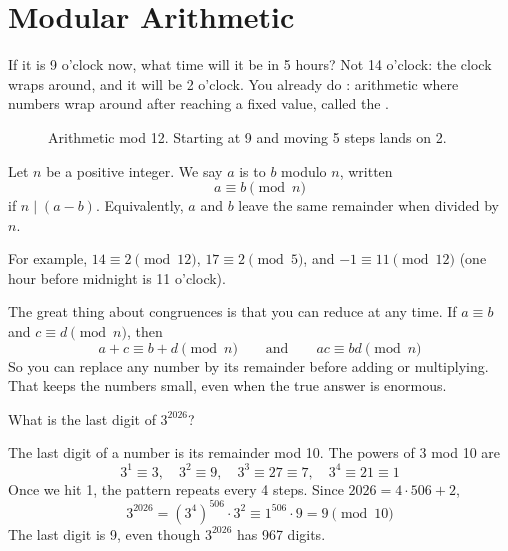 \section{Modular Arithmetic}

If it is 9 o'clock now, what time will it be in 5 hours? Not 14 o'clock: the
clock wraps around, and it will be 2 o'clock. You already do
: arithmetic where numbers wrap around after
reaching a fixed value, called the .

\begin{figure}[H]
\centering
{}
\caption{Arithmetic mod 12. Starting at 9 and moving 5 steps lands on 2.}
\label{fig:clock-mod12}
\end{figure}

\begin{definition}
Let $n$ be a positive integer. We say $a$ is  to $b$ modulo
$n$, written
$$a \equiv b \pmod{n}$$
if $n \mid (a - b)$. Equivalently, $a$ and $b$ leave the same remainder when
divided by $n$.
\end{definition}

For example, $14 \equiv 2 \pmod{12}$, $17 \equiv 2 \pmod{5}$, and
$-1 \equiv 11 \pmod{12}$ (one hour before midnight is 11 o'clock).

The great thing about congruences is that you can reduce at any time. If
$a \equiv b$ and $c \equiv d \pmod{n}$, then
$$a + c \equiv b + d \pmod{n} \qquad \text{and} \qquad ac \equiv bd \pmod{n}$$
So you can replace any number by its remainder before adding or multiplying.
That keeps the numbers small, even when the true answer is enormous.

\begin{Worked}
\begin{Problem}
What is the last digit of $3^{2026}$?
\end{Problem}
\begin{Solution}
The last digit of a number is its remainder mod 10. The
powers of 3 mod 10 are
$$3^1 \equiv 3, \quad 3^2 \equiv 9, \quad 3^3 \equiv 27 \equiv 7, \quad 3^4 \equiv 21 \equiv 1$$
Once we hit 1, the pattern repeats every 4 steps. Since $2026 = 4 \cdot 506 + 2$,
$$3^{2026} = \left(3^4\right)^{506} \cdot 3^2 \equiv 1^{506} \cdot 9 = 9 \pmod{10}$$
The last digit is 9, even though $3^{2026}$ has 967 digits.
\end{Solution}
\end{Worked}

